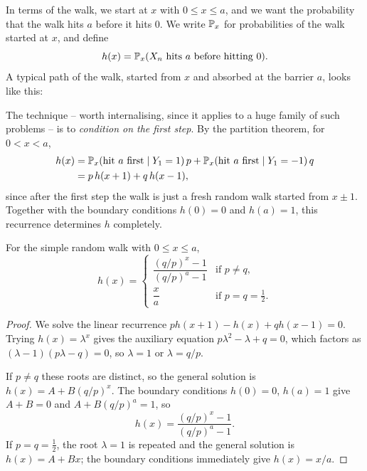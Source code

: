 \documentclass[a4paper]{scrartcl}
\begin{document}
In terms of the walk, we start at $x$ with $0 \leq x \leq a$, and we want the probability that the walk hits $a$ before it hits $0$. We write $\mathbb{P}_x$ for probabilities of the walk started at $x$, and define
$$
h(x) = \mathbb{P}_x(X_n \text{ hits } a \text{ before hitting } 0).
$$
A typical path of the walk, started from $x$ and absorbed at the barrier $a$, looks like this:
\begin{center}
\end{center}

The technique -- worth internalising, since it applies to a huge family of such problems -- is to \emph{condition on the first step}. By the partition theorem, for $0 < x < a$,
\begin{align*}
	h(x) &= \mathbb{P}_x(\text{hit } a \text{ first} \mid Y_1 = 1)\,p + \mathbb{P}_x(\text{hit } a \text{ first} \mid Y_1 = -1)\,q \\
	&= p\,h(x + 1) + q\,h(x - 1),
\end{align*}
since after the first step the walk is just a fresh random walk started from $x \pm 1$. Together with the boundary conditions $h(0) = 0$ and $h(a) = 1$, this recurrence determines $h$ completely.

\begin{theorem}
	For the simple random walk with $0 \leq x \leq a$,
	$$
	h(x) = \begin{cases}
		\dfrac{(q/p)^x - 1}{(q/p)^a - 1} & \text{if } p \neq q, \\[2ex]
		\dfrac{x}{a} & \text{if } p = q = \frac12.
	\end{cases}
	$$
\end{theorem}
\begin{proof}
	We solve the linear recurrence $p h(x+1) - h(x) + q h(x - 1) = 0$. Trying $h(x) = \lambda^x$ gives the auxiliary equation $p\lambda^2 - \lambda + q = 0$, which factors as $(\lambda - 1)(p\lambda - q) = 0$, so $\lambda = 1$ or $\lambda = q/p$.

	If $p \neq q$ these roots are distinct, so the general solution is $h(x) = A + B(q/p)^x$. The boundary conditions $h(0) = 0$, $h(a) = 1$ give $A + B = 0$ and $A + B(q/p)^a = 1$, so
	$$
	h(x) = \frac{(q/p)^x - 1}{(q/p)^a - 1}.
	$$
	If $p = q = \frac{1}{2}$, the root $\lambda = 1$ is repeated and the general solution is $h(x) = A + Bx$; the boundary conditions immediately give $h(x) = x/a$.
\end{proof}
\end{document}
